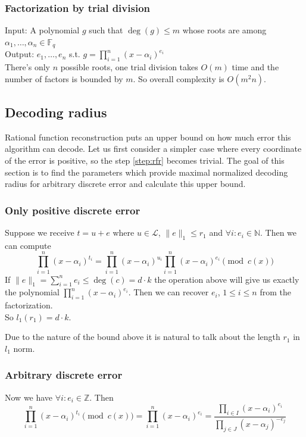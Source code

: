 \documentclass[12pt]{article}
\begin{document}
\subsubsection{Factorization by trial division}
\label{subsubsec:factoring_polynomials}
Input: A polynomial $g$ such that $\deg(g) \leq m$ whose roots are among $\alpha_1, \dots , \alpha_n \in \mathbb{F}_q$\\
Output: $e_1, \dots , e_n$ s.t. $g = \prod_{i = 1}^{n}(x - \alpha_i)^{e_i}$\\
There's only $n$ possible roots, one trial division takes $O(m)$ time and the number of factors is bounded by $m$. So overall complexity is $O(m^2n)$.


\subsection{Decoding radius}
\label{subsec:radius_polynomials}

Rational function reconstruction puts an upper bound on how much error this algorithm can decode. Let us first consider a simpler case where every coordinate of the error is positive, so the step \ref{step:rfr} becomes trivial. The goal of this section is to find the parameters which provide maximal normalized decoding radius for arbitrary discrete error and calculate this upper bound.

\subsubsection{Only positive discrete error}
\label{subsubsec:positive_error}
Suppose we receive $t = u + e$ where $u \in \mathcal{L}$, $\|e\|_1 \leq r_1$ and $\forall i: e_i \in \mathbb{N}$. Then we can compute
\[
\prod_{i = 1}^{n}(x - \alpha_i)^{t_i} = \prod_{i = 1}^{n}(x - \alpha_i)^{u_i}\prod_{i = 1}^{n}(x - \alpha_i)^{e_i} \pmod{c(x)}
\]
If $\|e\|_1 = \sum_{i =1}^{n} e_i \leq \deg(c) = d \cdot k$ the operation above will give us exactly the polynomial $\prod_{i = 1}^{n}(x - \alpha_i)^{e_i}$. Then we can recover $e_i$, $1 \leq i \leq n$ from the factorization.\\
So $l_1(r_1) = d \cdot k$.

Due to the nature of the bound above it is natural to talk about the length $r_1$ in $l_1$ norm.


\subsubsection{Arbitrary discrete error}
\label{subsubsec:discrete_error}
Now we have $\forall i: e_i \in \mathbb{Z}$. Then
\[
\prod_{i = 1}^{n}(x - \alpha_i)^{t_i} \pmod{c(x)} = \prod_{i = 1}^{n}(x - \alpha_i)^{e_i} = \frac{\prod_{i \in I}(x - \alpha_i)^{e_i}}{\prod_{j \in J}(x - \alpha_j)^{-e_j}}
\]
\end{document}
